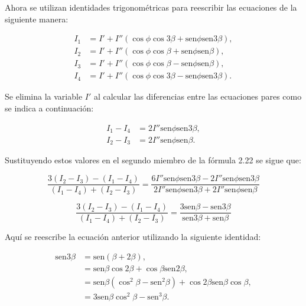 \documentclass[12pt,letterpaper]{article}
\begin{document}
\begin{enumerate}
		Ahora se utilizan identidades trigonométricas para reescribir las ecuaciones de la siguiente manera:
		
		\begin{equation}
			\begin{aligned}
				I_1 &= I' + I''(\cos\phi\cos3\beta + \text{sen}\phi\text{sen}3\beta), \\
				I_2 &= I' + I''(\cos\phi\cos\beta + \text{sen}\phi\text{sen}\beta), \\
				I_3 &= I' + I''(\cos\phi\cos\beta - \text{sen}\phi\text{sen}\beta), \\
				I_4 &= I' + I''(\cos\phi\cos3\beta - \text{sen}\phi\text{sen}3\beta).
			\end{aligned}
		\end{equation}
		
		Se elimina la variable $I'$ al calcular las diferencias entre las ecuaciones pares como se indica a continuación:
		
		\begin{equation}
			\begin{aligned}
				I_1 - I_4 &= 2I''\text{sen}\phi\text{sen}3\beta, \\
				I_2 - I_3 &= 2I''\text{sen}\phi\text{sen}\beta.
			\end{aligned}
		\end{equation}
		
		Sustituyendo estos valores en el segundo miembro de la fórmula 2.22 se sigue que:
		
		\begin{equation}
			\frac{3(I_2 - I_3) - (I_1 - I_4)}{(I_1 - I_4) + (I_2 - I_3)} = \frac{6I''\text{sen}\phi\text{sen}3\beta - 2I''\text{sen}\phi\text{sen}3\beta}{2I''\text{sen}\phi\text{sen}3\beta + 2I''\text{sen}\phi\text{sen}\beta}
		\end{equation}
		
		\begin{equation}
			\frac{3(I_2 - I_3) - (I_1 - I_4)}{(I_1 - I_4) + (I_2 - I_3)} = \frac{3\text{sen}\beta - \text{sen}3\beta}{\text{sen}3\beta + \text{sen}\beta}
		\end{equation}
		
		Aquí se reescribe la ecuación anterior utilizando la siguiente identidad:
		
		\begin{equation}
			\begin{aligned}
				\text{sen}3\beta &= \text{sen}(\beta + 2\beta), \\
				&= \text{sen}\beta\cos2\beta + \cos\beta\text{sen}2\beta, \\
				&= \text{sen}\beta(\cos^2\beta - \text{sen}^2\beta) + \cos2\beta\text{sen}\beta\cos\beta, \\
				&= 3\text{sen}\beta\cos^2\beta - \text{sen}^3\beta.
			\end{aligned}
		\end{equation}
		

\end{enumerate}
\end{document}
